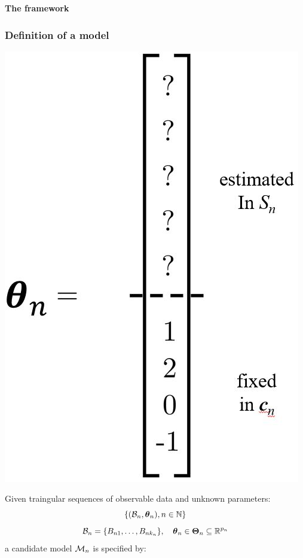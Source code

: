 \documentclass[handout,10pt]{beamer}
\begin{document}

\begin{frame}
\centering\huge
\textcolor{UniBlue}{\textbf{The framework}}
\end{frame}


\begin{frame}
\frametitle{Definition of a model}

\begin{minipage}{.35\textwidth}
\includegraphics[width=.9\textwidth]{condmodels1}
\end{minipage}
%
\begin{minipage}{.6\textwidth}
Given traingular sequences of observable data and unknown parameters:
%
$$
\{ ({\cal{B}}_n, {\boldsymbol{\theta}}_n) , n \in \mathbb N \}
$$
%
$$
{\cal{B}}_n = \{ B_{n1}, \ldots, B_{n k_n} \}
, \quad {\boldsymbol{\theta}}_n \in {\boldsymbol{\Theta}}_n \subseteq {\mathbb{R}}^{p_n}
$$
%
a candidate model ${\cal{M}}_n$ is specified by:


\end{minipage}
\end{frame}
\end{document}
